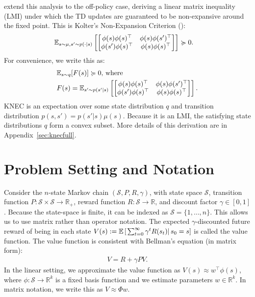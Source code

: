 \citet{kolter2011fixed} extend this analysis to the off-policy case, deriving a linear matrix inequality (LMI) under which the TD updates are guaranteed to be non-expansive around the fixed point. This is Kolter's Non-Expansion Criterion (\citeyear{kolter2011fixed}):
\begin{align}
  \mathbb{E}_{s\sim \mu, s'\sim p(\cdot|s)} & \left[\begin{bmatrix}
                                                \phi(s)\phi(s)^\top  & \phi(s)\phi(s')^\top \\
                                                \phi(s')\phi(s)^\top & \phi(s)\phi(s)^\top
                                              \end{bmatrix}\right] \succcurlyeq 0 . \label{eqn:knec}
\end{align}
For convenience, we write this as:
\begin{align}
& \mathbb{E}_{s\sim q}  [F(s)] \succcurlyeq 0 \text{, where} \\
& F(s) = \mathbb{E}_{s'\sim p(s'|s)}  \left[\begin{bmatrix}
                                     \phi(s)\phi(s)^\top  & \phi(s)\phi(s')^\top \\
                                     \phi(s')\phi(s)^\top & \phi(s)\phi(s)^\top
                                   \end{bmatrix}\right] .
\end{align}
KNEC is an expectation over some state distribution $q$ and transition distribution $p(s,s') = p(s'|s) \mu(s)$. Because it is an LMI, the satisfying state distributions $q$ form a convex subset. More details of this derivation are in Appendix~\ref{sec:knecfull}.


\section{Problem Setting and Notation }

Consider the $n$-state Markov chain $(\mathcal S, P, R, \gamma)$, with state space $\mathcal S$, transition function $P : \mathcal{S} \times \mathcal{S} \to \mathbb{R}_+$, reward function $R : \mathcal S \to \mathbb R$, and discount factor $\gamma \in [0, 1]$. 
Because the state-space is finite, it can be indexed as $\mathcal{S} = \{1, \ldots, n\}$.
This allows us to use matrix rather than operator notation.
The expected $\gamma$-discounted future reward of being in each state $V(s) := \mathbb{E} \left[\left.\sum_{t=0}^\infty \gamma^t R(s_t) \right| s_0 = s \right]$ is called the value function.
The value function is consistent with Bellman's equation (in matrix form):
\begin{align}
  V = R + \gamma P V .
\end{align}
In the linear setting, we approximate the value function as $V(s) \approx w^\top \phi(s)$, where $\phi : \mathcal S \to \mathbb R^{k}$ is a fixed basis function and we estimate parameters $w \in \mathbb R^k$. In matrix notation, we write this as $V \approx \Phi w$.

